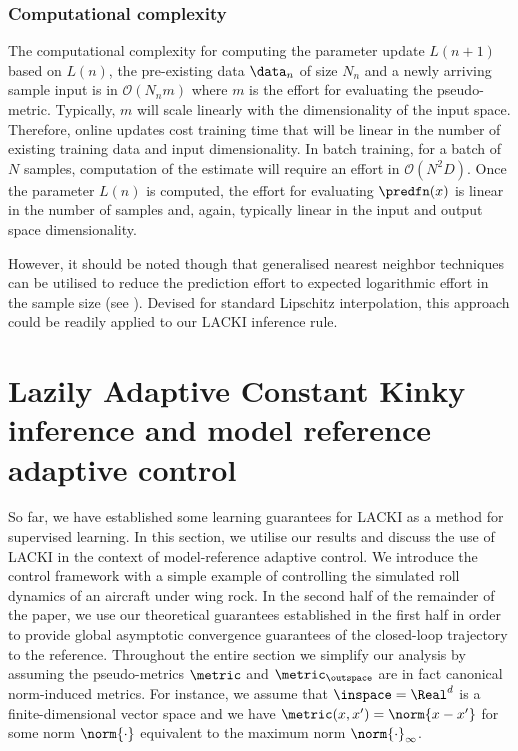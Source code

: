 \subsubsection{Computational complexity}
The computational complexity for computing the parameter update $L(n+1)$ based on $L(n)$, the pre-existing data $\data_n$ of size $N_n$ and a newly arriving sample input is in $\mathcal O(N_n m) $ where $m$ is the effort for evaluating the pseudo-metric. Typically, $m$ will scale linearly with the dimensionality of the input space. Therefore, online updates cost training time that will be linear in the number of existing training data and input dimensionality. In batch training, for a batch of $N$ samples, computation of the estimate will require an effort in $\mathcal O(N^2 D)$. 
Once the parameter $L(n)$ is computed, the effort for evaluating $\predfn(x)$ is linear in the number of samples and, again, typically linear in the input and output space dimensionality. 

However, it should be noted though that generalised nearest neighbor techniques can be utilised to reduce the prediction effort to expected logarithmic effort in the sample size (see \cite{Beliakov2006}). Devised for standard Lipschitz interpolation, this approach could be readily applied to our LACKI inference rule.

%
\section{Lazily Adaptive Constant Kinky inference and model reference adaptive control}
\label{sec:MRAC_lacki}
So far, we have established some learning guarantees for LACKI as a method for supervised learning. In this section, we utilise our results and discuss the use of LACKI in the context of model-reference adaptive control. We introduce the control framework with a simple example of controlling the simulated roll dynamics of an aircraft under wing rock. In the second half of the remainder of the paper, we use our theoretical guarantees established in the first half in order to provide global asymptotic convergence guarantees of the closed-loop trajectory to the reference. 
Throughout the entire section we simplify our analysis by assuming the pseudo-metrics $\metric$ and $\metric_\outspace$ are in fact canonical norm-induced metrics. For instance, we assume that $\inspace = \Real^d$ is a finite-dimensional vector space and we have $\metric(x,x') =\norm{x-x'}$ for some norm $\norm{\cdot}$ equivalent to the maximum norm $\norm{\cdot}_\infty$.

